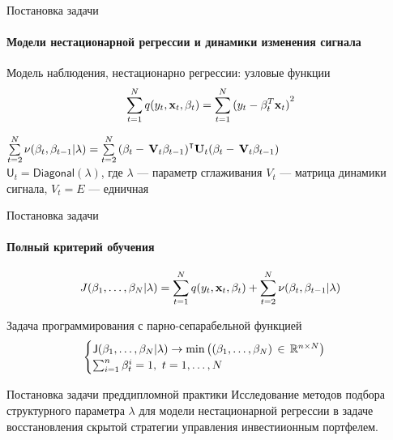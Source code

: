 \documentclass[11pt]{beamer}
\def\msf_#1{\mathsf{#1}}
\def\trans{^\intercal}
\begin{document}
\begin{frame}{Постановка задачи}
\framesubtitle{Модели нестационарной регрессии и динамики изменения сигнала}
\begin{block}{Модель наблюдения, нестационарно регрессии: узловые функции }
\[
\sum\limits_{t = 1}^N {q({y_t},{{\bf{x}}_t},{{\bf{\beta}}_t})}  = \sum\limits_{t = 1}^N {{{({y_t} - {\bf{\beta}}_t^T{{\bf{x}}_t})}^2}}
\]
\end{block}

\begin{tcolorbox}[beamer,title=Модель динамики: функции связи,height=3cm, colback=blue!5!white,colframe=blue!50!black]
$
\sum\limits_{t = 2}^N \nu({\bf{\beta}}_t, {\bf{\beta}}_{t-1}| \lambda) = \sum\limits_{t = 2}^N {{({{\bf{\beta}}_t} - \,{{\bf{V}}_t}{{\bf{\beta}}_{t - 1}})}\trans}{\bf{U}}_t({{\bf{\beta}}_t} - \,{{\bf{V}}_t}{{\bf{\beta}}_{t - 1}})$\\
$\msf_U_t = \msf_{Diagonal}(\lambda)$, где $\lambda$ --- параметр сглаживания $V_t$ --- матрица динамики сигнала, $V_t = E$ --- едничная
\end{tcolorbox}
\end{frame}

\begin{frame}{Постановка задачи}
\framesubtitle{Полный критерий обучения}
\begin{tcolorbox}[beamer,title=Общий критерий для оценивания состава портфеля,height=2.3cm, colback=blue!5!white,colframe=blue!50!black]
\[
J({\bf{\beta}}_1,\dots, {\bf{\beta}}_N|\lambda) = \sum\limits_{t = 1}^N q({y_t},{{\bf{x}}_t},{{\bf{\beta}}_t}) + \sum\limits_{t = 2}^N \nu({\bf{\beta}}_t, {\bf{\beta}}_{t-1}| \lambda)
\]
\end{tcolorbox}
\begin{block}{Задача программирования с парно-сепарабельной функцией}
\[\begin{cases}
\msf_J(\bold \beta_1, \dots, \bold \beta_N|\lambda)\to \min \left( {({{\bf{\beta}}_1},\dots,{{\bf{\beta}}_N})\, \in \,{\mathbb R^{n\times N}}} \right)\\
\sum_{i=1}^n \beta_t^i = 1,\ t=1,\dots,N
\end{cases}
\]
\end{block}
\begin{block}{Постановка задачи преддипломной практики}
Исследование методов подбора структурного параметра $\lambda$ для модели нестационарной регрессии в задаче восстановления скрытой стратегии управления инвестиионным портфелем.
\end{block}
\end{frame}
\end{document}
